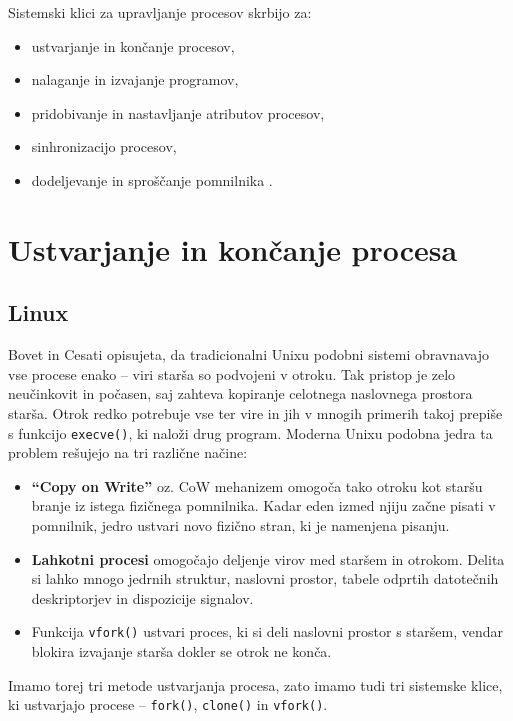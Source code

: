 \documentclass[a4paper,12pt,openright]{book}
\begin{document}
Sistemski klici za upravljanje procesov skrbijo za:
\begin{itemize}
	\item ustvarjanje in končanje procesov,
	\item nalaganje in izvajanje programov,
	\item pridobivanje in nastavljanje atributov procesov,
	\item sinhronizacijo procesov,
	\item dodeljevanje in sproščanje pomnilnika \cite{Silberschatz_Galvin_Gagne_2018}.
\end{itemize}

\section{Ustvarjanje in končanje procesa}

\subsection{Linux}

Bovet in Cesati \cite{Bovet_Cesati_2005} opisujeta, da tradicionalni Unixu podobni sistemi obravnavajo vse procese enako -- viri starša so podvojeni v otroku.
Tak pristop je zelo neučinkovit in počasen, saj zahteva kopiranje celotnega naslovnega prostora starša.
Otrok redko potrebuje vse ter vire in jih v mnogih primerih takoj prepiše s funkcijo \texttt{execve()}, ki naloži drug program.
Moderna Unixu podobna jedra ta problem rešujejo na tri različne načine:
\begin{itemize}
	\item \textbf{``Copy on Write''} oz. CoW mehanizem omogoča tako otroku kot staršu branje iz istega fizičnega pomnilnika.
	      Kadar eden izmed njiju začne pisati v pomnilnik, jedro ustvari novo fizično stran, ki je namenjena pisanju.
	\item \textbf{Lahkotni procesi} omogočajo deljenje virov med staršem in otrokom.
	      Delita si lahko mnogo jedrnih struktur, naslovni prostor, tabele odprtih datotečnih deskriptorjev in dispozicije signalov.
	\item Funkcija \texttt{vfork()} ustvari proces, ki si deli naslovni prostor s staršem, vendar blokira izvajanje starša dokler se otrok ne konča.
\end{itemize}

Imamo torej tri metode ustvarjanja procesa, zato imamo tudi tri sistemske klice, ki ustvarjajo procese -- \texttt{fork()}, \texttt{clone()} in \texttt{vfork()}.
\end{document}
